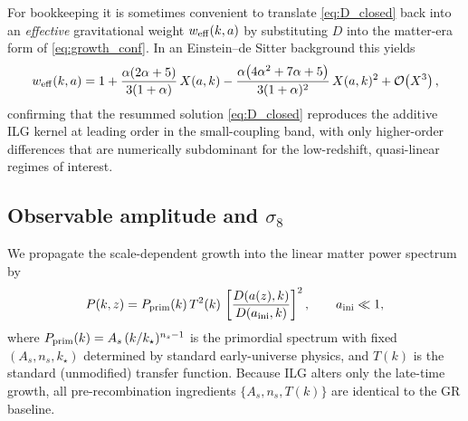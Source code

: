 \documentclass[11pt]{article}
\begin{document}
For bookkeeping it is sometimes convenient to translate \eqref{eq:D_closed} back into an \emph{effective} gravitational weight $w_{\rm eff}(k,a)$ by substituting $D$ into the matter-era form of \eqref{eq:growth_conf}. In an Einstein--de Sitter background this yields
\begin{equation}
w_{\rm eff}(k,a)
=
1 + \frac{\alpha(2\alpha+5)}{3(1+\alpha)}\,X(a,k)
- \frac{\alpha\bigl(4\alpha^2+7\alpha+5\bigr)}{3(1+\alpha)^2}\,X(a,k)^2 + \mathcal{O}\!\left(X^3\right),
\label{eq:w_eff_series}
\end{equation}
confirming that the resummed solution \eqref{eq:D_closed} reproduces the additive ILG kernel at leading order in the small-coupling band, with only higher-order differences that are numerically subdominant for the low-redshift, quasi-linear regimes of interest.

\subsection{Observable amplitude and \texorpdfstring{$\sigma_8$}{sigma8}}
We propagate the scale-dependent growth into the linear matter power spectrum by
\begin{equation}
P(k,z) = P_{\rm prim}(k)\,T^2(k)\,
\left[\frac{D\!\left(a(z),k\right)}{D\!\left(a_{\rm ini},k\right)}\right]^2,
\qquad a_{\rm ini}\ll 1,
\label{eq:Pk_with_ILG}
\end{equation}
where $P_{\rm prim}(k)=A_s\,(k/k_{\star})^{n_s-1}$ is the primordial spectrum with fixed $(A_s,n_s,k_{\star})$ determined by standard early-universe physics, and $T(k)$ is the standard (unmodified) transfer function. Because ILG alters only the late-time growth, all pre-recombination ingredients $\{A_s,n_s,T(k)\}$ are identical to the GR baseline.
\end{document}

